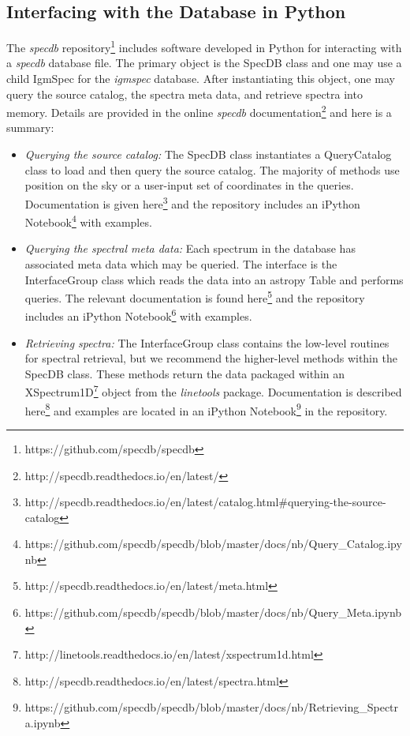 \documentclass[12pt]{elsarticle}
\begin{document}
\subsection{Interfacing with the Database in Python}

The {\it specdb} repository\footnote{https://github.com/specdb/specdb}
includes software developed in Python
for interacting with a {\it specdb} database file.  The primary
object is the SpecDB class and one may use a child IgmSpec for the
{\it igmspec} database.
After instantiating this object, one may query the source catalog,
the spectra meta data, and retrieve spectra into memory.
Details are provided in the online {\it specdb} 
documentation\footnote{http://specdb.readthedocs.io/en/latest/}
and here is a summary:

\begin{itemize}
\item {\it Querying the source catalog:}  The SpecDB class instantiates
a QueryCatalog class to load and then query the source catalog.  The
majority of methods use position on the sky or a user-input set of
coordinates in the queries.  Documentation is given here\footnote{http://specdb.readthedocs.io/en/latest/catalog.html\#querying-the-source-catalog}
and the repository includes an iPython Notebook\footnote{https://github.com/specdb/specdb/blob/master/docs/nb/Query\_Catalog.ipynb}
with examples.

\item {\it Querying the spectral meta data:}  Each spectrum in the
database has associated meta data which may be queried.  The interface
is the InterfaceGroup class which reads the data into an astropy Table
and performs queries.  The relevant documentation is found 
here\footnote{http://specdb.readthedocs.io/en/latest/meta.html}
and the repository includes an iPython Notebook\footnote{https://github.com/specdb/specdb/blob/master/docs/nb/Query\_Meta.ipynb}
with examples.

\item {\it Retrieving spectra:} The InterfaceGroup class contains the
low-level routines for spectral retrieval, but we recommend the higher-level
methods within the SpecDB class.  These methods return the data packaged
within an XSpectrum1D\footnote{http://linetools.readthedocs.io/en/latest/xspectrum1d.html} 
object from the {\it linetools} package.
Documentation is described 
here\footnote{http://specdb.readthedocs.io/en/latest/spectra.html}
and examples are located in an iPython 
Notebook\footnote{https://github.com/specdb/specdb/blob/master/docs/nb/Retrieving\_Spectra.ipynb}
in the repository.

\end{itemize}
\end{document}
